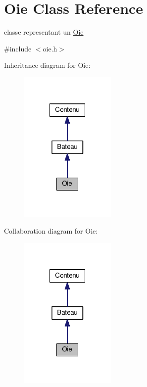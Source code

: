 \hypertarget{classOie}{\section{Oie Class Reference}
\label{classOie}
}


classe representant un \hyperlink{classOie}{Oie}  




{\ttfamily \#include $<$oie.\+h$>$}



Inheritance diagram for Oie\+:
\nopagebreak
\begin{figure}[H]
\begin{center}
\leavevmode
\includegraphics[width=132pt]{classOie__inherit__graph}
\end{center}
\end{figure}


Collaboration diagram for Oie\+:
\nopagebreak
\begin{figure}[H]
\begin{center}
\leavevmode
\includegraphics[width=132pt]{classOie__coll__graph}
\end{center}
\end{figure}

